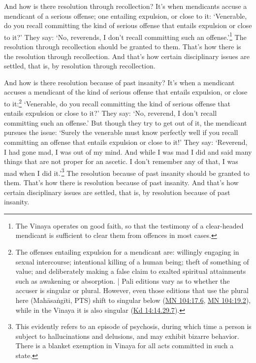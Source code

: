 \documentclass[12pt,openany]{book}%
\begin{document}
And how is there resolution through recollection? It’s when mendicants accuse a mendicant of a serious offense; one entailing expulsion, or close to it: ‘Venerable, do you recall committing the kind of serious offense that entails expulsion or close to it?’ They say: ‘No, reverends, I don’t recall committing such an offense.’\footnote{The Vinaya operates on good faith, so that the testimony of a clear-headed mendicant is sufficient to clear them from offences in most cases. } The resolution through recollection should be granted to them. That’s how there is the resolution through recollection. And that’s how certain disciplinary issues are settled, that is, by resolution through recollection. 

And how is there resolution because of past insanity? It’s when a mendicant accuses a mendicant of the kind of serious offense that entails expulsion, or close to it:\footnote{The offenses entailing expulsion for a mendicant are: willingly engaging in sexual intercourse; intentional killing of a human being; theft of something of value; and deliberately making a false claim to exalted spiritual attainments such as awakening or absorption. | Pali editions vary as to whether the accuser is singular or plural. However, even those editions that use the plural here (\textsanskrit{Mahāsaṅgīti}, PTS) shift to singular below (\href{https://suttacentral.net/mn104/en/sujato\#17.6}{MN 104:17.6}, \href{https://suttacentral.net/mn104/en/sujato\#19.2}{MN 104:19.2}), while in the Vinaya it is also singular (\href{https://suttacentral.net/pli-tv-kd14/en/sujato\#14.29.7}{Kd 14:14.29.7}). } ‘Venerable, do you recall committing the kind of serious offense that entails expulsion or close to it?’ They say: ‘No, reverend, I don’t recall committing such an offense.’ But though they try to get out of it, the mendicant pursues the issue: ‘Surely the venerable must know perfectly well if you recall committing an offense that entails expulsion or close to it!’ They say: ‘Reverend, I had gone mad, I was out of my mind. And while I was mad I did and said many things that are not proper for an ascetic. I don’t remember any of that, I was mad when I did it.’\footnote{This evidently refers to an episode of psychosis, during which time a person is subject to hallucinations and delusions, and may exhibit bizarre behavior. There is a blanket exemption in Vinaya for all acts committed in such a state. } The resolution because of past insanity should be granted to them. That’s how there is resolution because of past insanity. And that’s how certain disciplinary issues are settled, that is, by resolution because of past insanity. 
\end{document}
